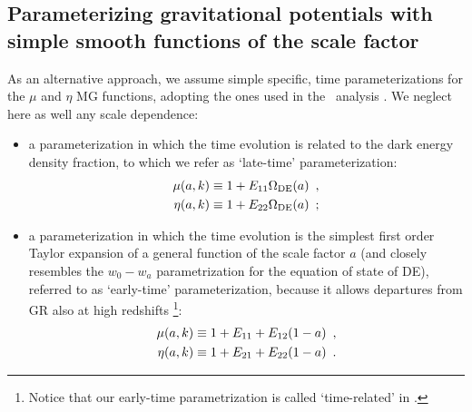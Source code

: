 \subsection{Parameterizing gravitational potentials with simple smooth functions of the scale factor \label{sub:param-smooth-funct}}
As an alternative approach, we assume simple specific, time parameterizations for
the $\mu$ and $\eta$ MG functions, adopting the ones used in the
\planck\ analysis \cite{planck_collaboration_planck_2016}. 
We neglect here as well any scale dependence:
\begin{itemize}
\item a parameterization in which the time evolution is related to the dark
energy density fraction, to which we refer as `late-time' parameterization:
\begin{eqnarray}
\mu(a,k)\equiv1+E_{{\rm 11}}\Omega_{{\rm
DE}}(a)\,\,\,,\label{eq:DE-mu-parametrization}\\
\eta(a,k)\equiv1+E_{{\rm 22}}\Omega_{{\rm
DE}}(a)\,\,\,;\label{eq:DE-eta-parametrization}
\end{eqnarray}

\item a parameterization in which the time evolution is the simplest first
order Taylor expansion of a general function of the scale factor $a$
(and closely resembles the $w_{0}-w_{a}$ parametrization for the
equation of state of DE), referred to as `early-time' parameterization, because it
allows departures from GR also at high redshifts
\footnote{Notice that our early-time parametrization is called
`time-related' in \cite{planck_collaboration_planck_2016}.}:
\begin{eqnarray}
\mu(a,k)\equiv1+E_{{\rm 11}}+E_{{\rm
12}}(1-a)\,\,\,,\label{eq:TR-mu-parametrization}\\
\eta(a,k)\equiv1+E_{{\rm 21}}+E_{{\rm
22}}(1-a)\,\,\,.\label{eq:TR-eta-parametrization}
\end{eqnarray}

\end{itemize}



